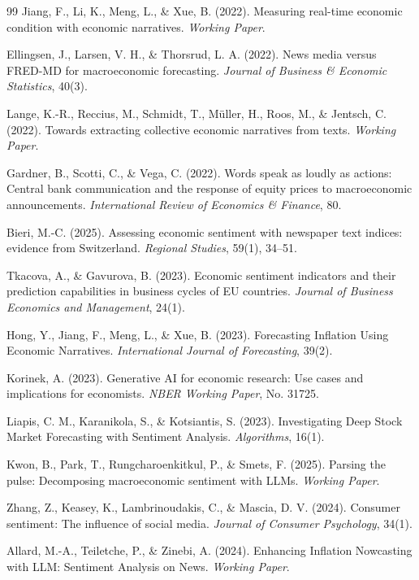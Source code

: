\documentclass[11pt]{article}
\begin{document}
\begin{thebibliography}{99}
 Jiang, F., Li, K., Meng, L., \& Xue, B. (2022). Measuring real-time economic condition with economic narratives. \textit{Working Paper}.

 Ellingsen, J., Larsen, V. H., \& Thorsrud, L. A. (2022). News media versus FRED-MD for macroeconomic forecasting. \textit{Journal of Business \& Economic Statistics}, 40(3).

 Lange, K.-R., Reccius, M., Schmidt, T., Müller, H., Roos, M., \& Jentsch, C. (2022). Towards extracting collective economic narratives from texts. \textit{Working Paper}.

 Gardner, B., Scotti, C., \& Vega, C. (2022). Words speak as loudly as actions: Central bank communication and the response of equity prices to macroeconomic announcements. \textit{International Review of Economics \& Finance}, 80.

 Bieri, M.-C. (2025). Assessing economic sentiment with newspaper text indices: evidence from Switzerland. \textit{Regional Studies}, 59(1), 34--51.

 Tkacova, A., \& Gavurova, B. (2023). Economic sentiment indicators and their prediction capabilities in business cycles of EU countries. \textit{Journal of Business Economics and Management}, 24(1).

 Hong, Y., Jiang, F., Meng, L., \& Xue, B. (2023). Forecasting Inflation Using Economic Narratives. \textit{International Journal of Forecasting}, 39(2).

 Korinek, A. (2023). Generative AI for economic research: Use cases and implications for economists. \textit{NBER Working Paper}, No. 31725.

 Liapis, C. M., Karanikola, S., \& Kotsiantis, S. (2023). Investigating Deep Stock Market Forecasting with Sentiment Analysis. \textit{Algorithms}, 16(1).

 Kwon, B., Park, T., Rungcharoenkitkul, P., \& Smets, F. (2025). Parsing the pulse: Decomposing macroeconomic sentiment with LLMs. \textit{Working Paper}.

 Zhang, Z., Keasey, K., Lambrinoudakis, C., \& Mascia, D. V. (2024). Consumer sentiment: The influence of social media. \textit{Journal of Consumer Psychology}, 34(1).

 Allard, M.-A., Teiletche, P., \& Zinebi, A. (2024). Enhancing Inflation Nowcasting with LLM: Sentiment Analysis on News. \textit{Working Paper}.


\end{thebibliography}
\end{document}

